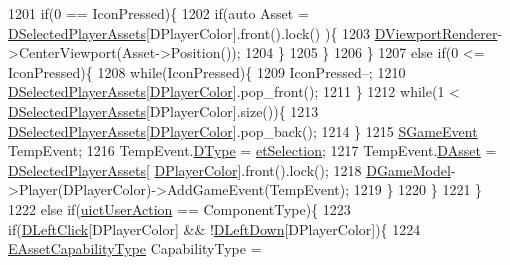 \begin{DoxyCode}
1201                 \textcolor{keywordflow}{if}(0 == IconPressed)\{
1202                     \textcolor{keywordflow}{if}(\textcolor{keyword}{auto} Asset = \hyperlink{classCApplicationData_a05c1087d5a5c4ddc14fcb37444f1642b}{DSelectedPlayerAssets}[DPlayerColor].front().lock()
      )\{
1203                         \hyperlink{classCApplicationData_a31da050ebca942272344c8b736d72848}{DViewportRenderer}->CenterViewport(Asset->Position());      
1204                     \}
1205                 \}
1206             \}
1207             \textcolor{keywordflow}{else} \textcolor{keywordflow}{if}(0 <= IconPressed)\{
1208                 \textcolor{keywordflow}{while}(IconPressed)\{
1209                     IconPressed--;
1210                     \hyperlink{classCApplicationData_a05c1087d5a5c4ddc14fcb37444f1642b}{DSelectedPlayerAssets}[\hyperlink{classCApplicationData_a53550939b20cba70570f113e4d1c5d02}{DPlayerColor}].pop\_front();
1211                 \}
1212                 \textcolor{keywordflow}{while}(1 < \hyperlink{classCApplicationData_a05c1087d5a5c4ddc14fcb37444f1642b}{DSelectedPlayerAssets}[DPlayerColor].size())\{
1213                     \hyperlink{classCApplicationData_a05c1087d5a5c4ddc14fcb37444f1642b}{DSelectedPlayerAssets}[\hyperlink{classCApplicationData_a53550939b20cba70570f113e4d1c5d02}{DPlayerColor}].pop\_back();
1214                 \}
1215                 \hyperlink{structSGameEvent}{SGameEvent} TempEvent;
1216                 TempEvent.\hyperlink{structSGameEvent_afa10562e243f4ac2b473b655cc58fee7}{DType} = \hyperlink{GameModel_8h_abfcf510bafec7c6429906a6ecaac656da38393c2ecd9404ab15f2f9bb5aab0497}{etSelection};
1217                 TempEvent.\hyperlink{structSGameEvent_a40c85eeac83b96887b7449c9bdc5d624}{DAsset} = \hyperlink{classCApplicationData_a05c1087d5a5c4ddc14fcb37444f1642b}{DSelectedPlayerAssets}[
      \hyperlink{classCApplicationData_a53550939b20cba70570f113e4d1c5d02}{DPlayerColor}].front().lock();
1218                 \hyperlink{classCApplicationData_a32b50c7c1cbac3cfd67c7f775b1d6fee}{DGameModel}->Player(DPlayerColor)->AddGameEvent(TempEvent);
1219             \}
1220         \}
1221     \}
1222     \textcolor{keywordflow}{else} \textcolor{keywordflow}{if}(\hyperlink{classCApplicationData_ad49585591fc53bff1c89bc512170280da9b2752db122b319f942c3b69c2accfab}{uictUserAction} == ComponentType)\{
1223         \textcolor{keywordflow}{if}(\hyperlink{classCApplicationData_a8a86bb4c7cba7b119121401dda4ca68b}{DLeftClick}[DPlayerColor] && !\hyperlink{classCApplicationData_a2b943f18557c3e4c8cd4550e22e028b6}{DLeftDown}[DPlayerColor])\{
1224             \hyperlink{GameDataTypes_8h_a35b98ce26aca678b03c6f9f76e4778ce}{EAssetCapabilityType} CapabilityType = 

\end{DoxyCode}
